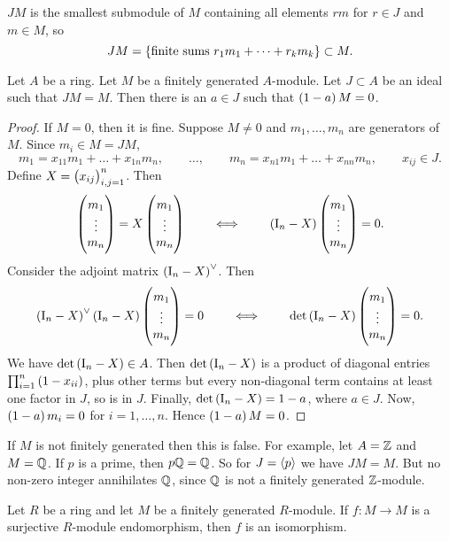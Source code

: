 \begin{remark*}
$ JM $ is the smallest submodule of $ M $ containing all elements $ rm $ for $ r \in J $ and $ m \in M $, so
$$ JM = \cbr{\text{finite sums} \ r_1m_1 + \dots + r_km_k} \subset M. $$
\end{remark*}

\begin{lemma}
\label{lem:9.7}
Let $ A $ be a ring. Let $ M $ be a finitely generated $ A $-module. Let $ J \subset A $ be an ideal such that $ JM = M $. Then there is an $ a \in J $ such that $ \br{1 - a}M = 0 $.
\end{lemma}

\begin{proof}
If $ M = 0 $, then it is fine. Suppose $ M \ne 0 $ and $ m_1, \dots, m_n $ are generators of $ M $. Since $ m_i \in M = JM $,
$$ m_1 = x_{11}m_1 + \dots + x_{1n}m_n, \qquad \dots, \qquad m_n = x_{n1}m_1 + \dots + x_{nn}m_n, \qquad x_{ij} \in J. $$
Define $ X = \br{x_{ij}}_{i, j = 1}^n $. Then
$$ \threebyone{m_1}{\vdots}{m_n} = X\threebyone{m_1}{\vdots}{m_n} \qquad \iff \qquad \br{\I_n - X}\threebyone{m_1}{\vdots}{m_n} = 0. $$
Consider the adjoint matrix $ \br{\I_n - X}^\vee $. Then
$$ \br{\I_n - X}^\vee\br{\I_n - X}\threebyone{m_1}{\vdots}{m_n} = 0 \qquad \iff \qquad \det \br{\I_n - X}\threebyone{m_1}{\vdots}{m_n} = 0. $$
We have $ \det \br{\I_n - X} \in A $. Then $ \det \br{\I_n - X} $ is a product of diagonal entries $ \prod_{i = 1}^n \br{1 - x_{ii}} $, plus other terms but every non-diagonal term contains at least one factor in $ J $, so is in $ J $. Finally, $ \det \br{\I_n - X} = 1 - a $, where $ a \in J $. Now, $ \br{1 - a}m_i = 0 $ for $ i = 1, \dots, n $. Hence $ \br{1 - a}M = 0 $.
\end{proof}


\begin{remark*}
If $ M $ is not finitely generated then this is false. For example, let $ A = \mathbb{Z} $ and $ M = \mathbb{Q} $. If $ p $ is a prime, then $ p\mathbb{Q} = \mathbb{Q} $. So for $ J = \left\langle p \right\rangle $ we have $ JM = M $. But no non-zero integer annihilates $ \mathbb{Q} $, since $ \mathbb{Q} $ is not a finitely generated $ \mathbb{Z} $-module.
\end{remark*}

\begin{corollary}
Let $ R $ be a ring and let $ M $ be a finitely generated $ R $-module. If $ f : M \to M $ is a surjective $ R $-module endomorphism, then $ f $ is an isomorphism.
\end{corollary}

